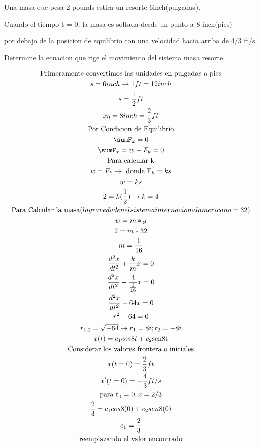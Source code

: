 \documentclass{article}
\begin{document}
Una masa que pesa 2 pounds estira un resorte 6inch(pulgadas). 

Cuando el tiempo t = 0, la masa es soltada desde un punto a 8 inch(pies) 

por debajo de la posicion de equilibrio con una velocidad hacia arriba de 4/3 ft/s. 

Determine la ecuacion que rige el movimiento del sistema masa resorte.




\begin{gather*}
\text{Primeramente convertimos las unidades en pulgadas a pies} \\
s  = 6 inch   \rightarrow  1ft=12inch \\
s = \frac{1}{2}ft \\
x_{0} = 8inch = \frac{2}{3}ft \\
\text{Por Condicion de Equilibrio} \\
\sumF_{x} = 0 \\
\sumF_{x} = w-F_{k} = 0 \\
\text{Para calcular k} \\
w = F_{k}      \rightarrow \text{ donde F}_{k}= ks \\
w = ks \\
2 = k(\frac{1}{2})  \rightarrow  k=4 \\
\text{Para Calcular la masa}(la gravedad en el sistema internacional americano=32) \\
w = m*g \\
2 = m*32 \\
m =\frac{1}{16} \\
\frac{d^{2}x}{dt^{2}}+\frac{k}{m}x = 0 \\
\frac{d^{2}x}{dt^{2}}+\frac{4}{\frac{1}{16}}x = 0 \\
\frac{d^{2}x}{dt^{2}}+64x = 0 \\
r^{2}+64 = 0 \\
r_{1,2} = \sqrt{-64}  \rightarrow r_{1}= 8i ; r_{2}=-8i  \\
x(t) = c_{1}cos8t+c_{2}\text{sen8t} \\
\text{Considerar los valores frontera o iniciales} \\
x(t=0) = \frac{2}{3}ft \\
x'(t=0) = -\frac{4}{3}ft/s \\
\text{para t}_{0} =0, x =2/3 \\
\frac{2}{3}= c_{1}cos8(0)+c_{2}sen8(0) \\
c_{1}= \frac{2}{3} \\
\text{reemplazando el valor encontrado} \\

\end{gather*}
\end{document}
